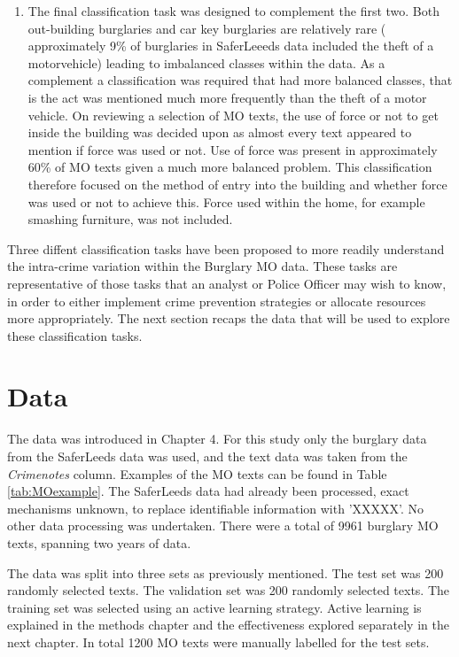 \begin{enumerate}
 \item The final classification task was designed to complement the first two. Both out-building burglaries and car key burglaries are relatively rare ( approximately 9\% of burglaries in SaferLeeeds data included the theft of a motorvehicle) leading to imbalanced classes within the data. As a complement a classification was required that had more balanced classes, that is the act was mentioned much more frequently than the theft of a motor vehicle. On reviewing a selection of MO texts, the use of force or not to get inside the building was decided upon as almost every text appeared to mention if force was used or not. Use of force was present in approximately 60\% of MO texts given a much more balanced problem. This classification therefore focused on the method of entry into the building and whether force was used or not to achieve this. Force used within the home, for example smashing furniture, was not included.

\end{enumerate}


Three diffent classification tasks have been proposed to more readily understand the intra-crime variation within the Burglary MO data. These tasks are representative of those tasks that an analyst or Police Officer may wish to know, in order to either implement crime prevention strategies or allocate resources more appropriately. The next section recaps the data that will be used to explore these classification tasks. 


\section{Data} The data was introduced in Chapter 4. For this study only the burglary data from the SaferLeeds data was used, and the text data was taken from the \emph{Crimenotes} column. Examples of the MO texts can be found in Table \ref{tab:MOexample}. The SaferLeeds data had already been processed, exact mechanisms unknown, to replace identifiable information with 'XXXXX'. No other data processing was undertaken. There were a total of 9961 burglary MO texts, spanning two years of data.

The data was split into three sets as previously mentioned. The test set was 200 randomly selected texts. The validation set was 200 randomly selected texts. The training set was selected using an active learning strategy. Active learning is explained in the methods chapter and the effectiveness explored separately in the next chapter. In total 1200 MO texts were manually labelled for the test sets. 

